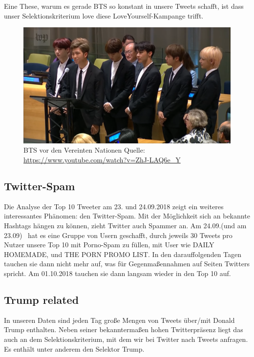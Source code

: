 Eine These, warum es gerade BTS so konstant in unsere Tweets schafft,
ist dass unser Selektionskriterium love diese LoveYourself-Kampange
trifft.

\begin{figure}
\centering
\includegraphics[width=\textwidth]{bilder/eigene20PrC3A4sentation-img4.png}
\caption{BTS vor den Vereinten Nationen Quelle: \url{https://www.youtube.com/watch?v=ZhJ-LAQ6e_Y}}
\end{figure}

\bigskip

\subsection{Twitter-Spam}
Die Analyse der Top 10 Tweeter am 23. und 24.09.2018 zeigt ein weiteres
interessantes Phänomen: den Twitter-Spam. Mit der Möglichkeit sich an
bekannte Hashtags hängen zu können, zieht Twitter auch Spammer an. Am
24.09.(und am 23.09) \ hat es eine Gruppe von Usern geschafft, durch
jeweils 30 Tweets pro Nutzer unsere Top 10 mit Porno-Spam zu füllen,
mit User wie DAILY HOMEMADE, und THE PORN PROMO LIST. In den
darauffolgenden Tagen tauchen sie dann nicht mehr auf, was für
Gegenmaßennahmen auf Seiten Twitters spricht. Am 01.10.2018 tauchen sie
dann langsam wieder in den Top 10 auf.

\subsection{Trump related}
In unseren Daten sind jeden Tag große Mengen von Tweets über/mit Donald
Trump enthalten. Neben seiner bekanntermaßen hohen Twitterpräsenz liegt
das auch an dem Selektionskriterium, mit dem wir bei Twitter nach
Tweets anfragen. Es enthält unter anderem den Selektor Trump.

